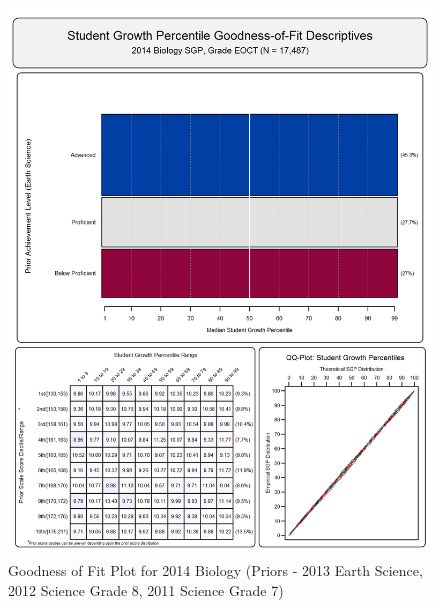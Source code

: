 \documentclass[12pt]{article}
\begin{document}
\begin{figure}[htbp]
\centering
\includegraphics{../img/Goodness_of_Fit/BIOLOGY.2014/2014_BIOLOGY_EOCT;2013_EARTH_SCIENCE_EOCT;2012_SCIENCE_8;2011_SCIENCE_7.png}
\caption{Goodness of Fit Plot for 2014 Biology (Priors - 2013 Earth
Science, 2012 Science Grade 8, 2011 Science Grade 7)}
\end{figure}
\end{document}
